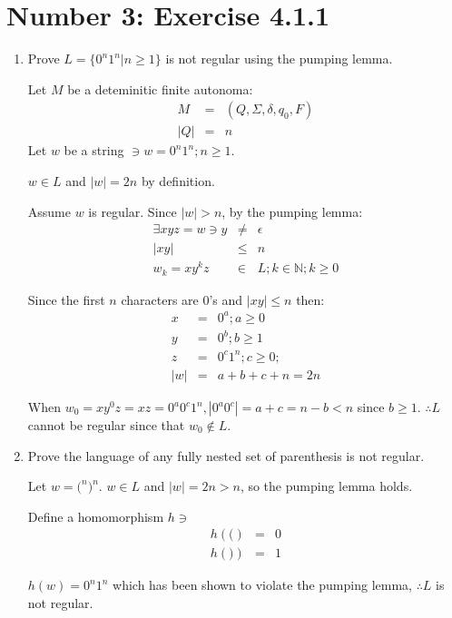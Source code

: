 \documentclass[12pt,a4paper,twoside]{article}  %
\begin{document}
\section{Number 3: Exercise 4.1.1}
\begin{enumerate}

\item Prove $L = \{0^n1^n | n \geq 1\}$ is not regular using the
pumping lemma.

Let $M$ be a deteminitic finite autonoma:
\begin{eqnarray}
  M &=& (Q, \Sigma, \delta, q_0, F) \\
|Q| &=& n
\end{eqnarray}
Let $w$ be a string $\ni w = 0^n1^n; n \geq 1$.

$w \in L$ and $|w| = 2n$ by definition.

Assume $w$ is regular. Since $|w| > n$, by the pumping lemma:
\begin{eqnarray}
\exists xyz = w \ni y &\neq& \epsilon \\
                 |xy| &\leq& n \\
          w_k = xy^kz &\in& L; k \in \mathbb{N}; k \geq 0
\end{eqnarray}

Since the first $n$ characters are 0's and $|xy| \leq n$ then:
\begin{eqnarray}
x &=& 0^a; a \geq 0 \\
y &=& 0^b; b \geq 1 \\
z &=& 0^c1^n; c \geq 0; \\
|w| &=& a + b + c + n = 2n
\end{eqnarray}

When $w_0 = xy^0z = xz = 0^a0^c1^n, |0^a0^c| = a + c = n - b < n$
since $b \geq 1$. $\therefore L$ cannot be regular since that
$w_0 \not \in L$.

\item Prove the language of any fully nested set of parenthesis is
not regular.

Let $w = \textrm{(}^n\textrm{)}^n$. $w \in L$ and $|w| = 2n > n$, so
the pumping lemma holds.

Define a homomorphism $h \ni$
\begin{eqnarray}
h(\textrm{(}) &=& 0 \\
h(\textrm{)}) &=& 1
\end{eqnarray}

$h(w) = 0^n1^n$ which has been shown to violate the pumping lemma,
$\therefore L$ is not regular.


\end{enumerate}
\end{document}
